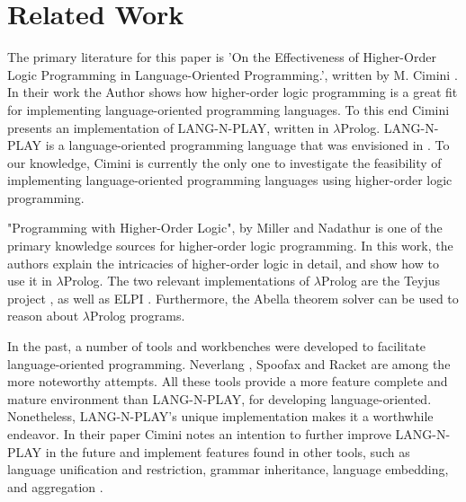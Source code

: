 
\section{Related Work}
\label{related-work}

The primary literature for this paper is 'On the Effectiveness of Higher-Order Logic Programming in Language-Oriented Programming.', written by M. Cimini \cite{cimini_effectiveness_2020}. In their work the Author shows how higher-order logic programming is a great fit for implementing language-oriented programming languages. To this end Cimini presents an implementation of LANG-N-PLAY, written in $\lambda$Prolog. LANG-N-PLAY is a language-oriented programming language that was envisioned in \cite{cimini_languages_2018}. To our knowledge, Cimini is currently the only one to investigate the feasibility of implementing language-oriented programming languages using higher-order logic programming.

"Programming with Higher-Order Logic", by Miller and Nadathur is one of the primary knowledge sources for higher-order logic programming. In this work, the authors explain the intricacies of higher-order logic in detail, and show how to use it in $\lambda$Prolog. The two relevant implementations of $\lambda$Prolog are the Teyjus project \cite{noauthor_teyjusteyjus_2022}, as well as ELPI \cite{noauthor_elpi_2022}. Furthermore, the Abella theorem solver \cite{noauthor_abella_nodate} can be used to reason about $\lambda$Prolog programs.

In the past, a number of tools and workbenches were developed to facilitate language-oriented programming. Neverlang \cite{vacchi_neverlang_2015}, Spoofax \cite{kats_spoofax_2010} and Racket \cite{flatt_reference_2010} are among the more noteworthy attempts. All these tools provide a more feature complete and mature environment than LANG-N-PLAY, for developing language-oriented. Nonetheless, LANG-N-PLAY's unique implementation makes it a worthwhile endeavor. In their paper Cimini notes an intention to further improve LANG-N-PLAY in the future and implement features found in other tools, such as language unification and restriction, grammar inheritance, language embedding, and aggregation \cite{cimini_effectiveness_2020}.
